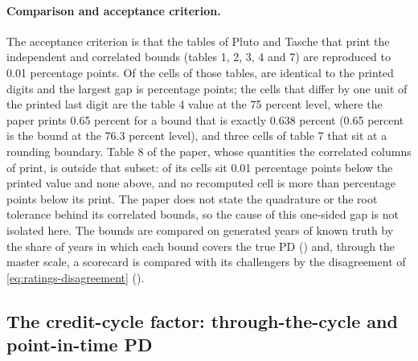 \paragraph{Comparison and acceptance criterion.} The acceptance criterion is that the tables of Pluto and Tasche that print the independent and correlated bounds (tables 1, 2, 3, 4 and 7) are reproduced to 0.01 percentage points. Of the \rtgPtSpecN{} cells of those tables, \rtgPtSpecIdent{} are identical to the printed digits and the largest gap is \rtgPtSpecMax{} percentage points; the cells that differ by one unit of the printed last digit are the table 4 value at the 75 percent level, where the paper prints 0.65 percent for a bound that is exactly 0.638 percent (0.65 percent is the bound at the 76.3 percent level), and three cells of table 7 that sit at a rounding boundary. Table 8 of the paper, whose quantities the correlated columns of  print, is outside that subset: \rtgPtEightLow{} of its \rtgPtEightN{} cells sit 0.01 percentage points below the printed value and none above, and no recomputed cell is more than \rtgPtEightMax{} percentage points below its print. The paper does not state the quadrature or the root tolerance behind its correlated bounds, so the cause of this one-sided gap is not isolated here. The bounds are compared on generated years of known truth by the share of years in which each bound covers the true PD () and, through the master scale, a scorecard is compared with its challengers by the disagreement of \cref{eq:ratings-disagreement} ().

\subsection{The credit-cycle factor: through-the-cycle and point-in-time PD}
\label{sec:m8}

